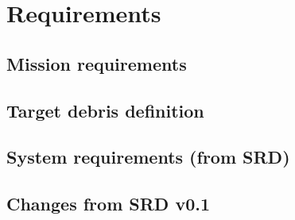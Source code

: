 \chapter{Requirements}
\label{ch:requirements}
\section{Mission requirements}

\section{Target debris definition}

\section{System requirements (from SRD)}

\section{Changes from SRD v0.1}
